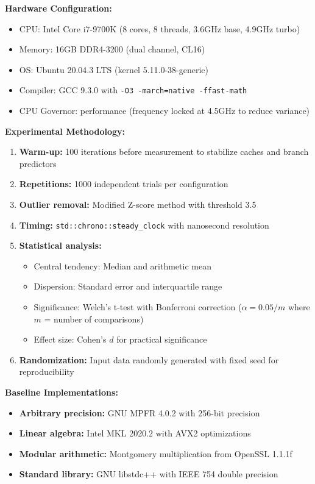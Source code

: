 \documentclass[11pt]{article}
\theoremstyle{definition}
\begin{document}
\textbf{Hardware Configuration:}
\begin{itemize}
\item CPU: Intel Core i7-9700K (8 cores, 8 threads, 3.6GHz base, 4.9GHz turbo)
\item Memory: 16GB DDR4-3200 (dual channel, CL16)
\item OS: Ubuntu 20.04.3 LTS (kernel 5.11.0-38-generic)
\item Compiler: GCC 9.3.0 with \texttt{-O3 -march=native -ffast-math}
\item CPU Governor: performance (frequency locked at 4.5GHz to reduce variance)
\end{itemize}

\textbf{Experimental Methodology:}
\begin{enumerate}
\item \textbf{Warm-up:} 100 iterations before measurement to stabilize caches and branch predictors
\item \textbf{Repetitions:} 1000 independent trials per configuration
\item \textbf{Outlier removal:} Modified Z-score method with threshold 3.5
\item \textbf{Timing:} \texttt{std::chrono::steady\_clock} with nanosecond resolution
\item \textbf{Statistical analysis:}
  \begin{itemize}
  \item Central tendency: Median and arithmetic mean
  \item Dispersion: Standard error and interquartile range
  \item Significance: Welch's t-test with Bonferroni correction ($\alpha = 0.05 / m$ where $m$ = number of comparisons)
  \item Effect size: Cohen's $d$ for practical significance
  \end{itemize}
\item \textbf{Randomization:} Input data randomly generated with fixed seed for reproducibility
\end{enumerate}

\textbf{Baseline Implementations:}
\begin{itemize}
\item \textbf{Arbitrary precision:} GNU MPFR 4.0.2 with 256-bit precision
\item \textbf{Linear algebra:} Intel MKL 2020.2 with AVX2 optimizations
\item \textbf{Modular arithmetic:} Montgomery multiplication from OpenSSL 1.1.1f
\item \textbf{Standard library:} GNU libstdc++ with IEEE 754 double precision
\end{itemize}
\end{document}
